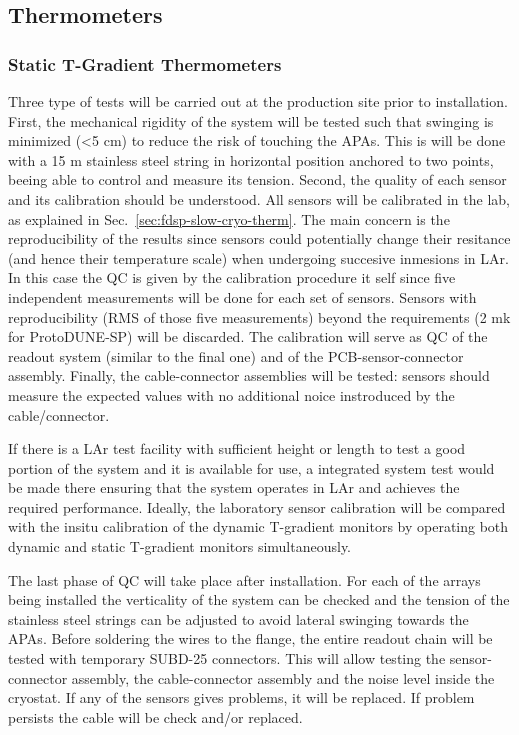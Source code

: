 \subsection{Thermometers}
\label{sec:fdsp-slow-cryo-qc-th}

\subsubsection{Static T-Gradient Thermometers}
\label{sec:fdsp-slow-cryo-qc-thst}


Three type of tests will be carried out at the production site prior to installation. First, the mechanical rigidity of the system will be tested such that swinging is minimized (<5 cm)
to reduce the risk of touching the APAs. This is will be done with a 15 m stainless steel string in horizontal position anchored to two points, beeing able to control and measure its tension. 
Second, the quality of each sensor and its calibration should be understood. All sensors will be calibrated in the lab, as explained in Sec.~\ref{sec:fdsp-slow-cryo-therm}.
The main concern is the reproducibility of the results since sensors could potentially change their resitance (and hence their temperature scale)
when undergoing succesive inmesions in LAr. In this case the QC is given by the calibration procedure it self since five independent measurements
will be done for each set of sensors. Sensors with reproducibility (RMS of those five measurements) beyond the requirements (2 mk for ProtoDUNE-SP) will be discarded.  
The calibration will serve as QC of the readout system (similar to the final one) and of the PCB-sensor-connector assembly. Finally, the cable-connector assemblies will
be tested: sensors should measure the expected values with no additional noice instroduced by the cable/connector. 

If there is a LAr test facility with sufficient height or length to test a good portion of the system 
and it is available for use, a integrated system test would be made there ensuring that the system
operates in LAr and achieves the required performance. Ideally, the laboratory sensor calibration will be compared with the insitu calibration
of the dynamic T-gradient monitors by operating both dynamic and static T-gradient monitors simultaneously.   

The last phase of QC will take place after installation. For each of the arrays being installed
the verticality of the system can be checked and the tension of the stainless steel strings can be adjusted to avoid lateral swinging towards the APAs. 
Before soldering the wires to the flange, the entire readout chain will be tested with temporary SUBD-25 connectors. 
This will allow testing the sensor-connector assembly, the cable-connector assembly and the noise level inside the cryostat.
If any of the sensors gives problems, it will be replaced. If problem persists the cable will be check and/or replaced.


